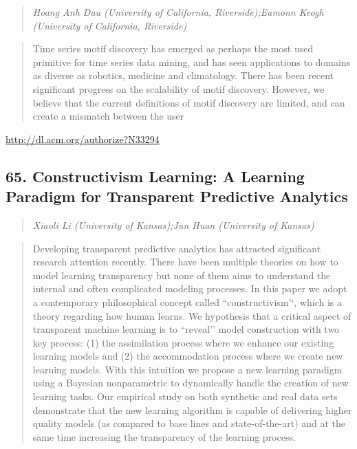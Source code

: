 \documentclass{article}
\begin{document}
\begin{quote}
\footnotesize{\textit{Hoang Anh Dau (University of California, Riverside);Eamonn Keogh (University of California, Riverside)}}

\end{quote}

\begin{quote}
Time series motif discovery has emerged as perhaps the most used primitive for time series data mining, and has seen applications to domains as diverse as robotics, medicine and climatology. There has been recent significant progress on the scalability of motif discovery. However, we believe that the current definitions of motif discovery are limited, and can create a mismatch between the user
\end{quote}

\href{http://dl.acm.org/authorize?N33294}{http://dl.acm.org/authorize?N33294}

\subsection{65. Constructivism Learning: A Learning Paradigm for Transparent Predictive Analytics}

\begin{quote}
\footnotesize{\textit{Xiaoli Li (University of Kansas);Jun Huan (University of Kansas)}}

\end{quote}

\begin{quote}
Developing transparent predictive analytics has attracted significant research attention recently. There have been multiple theories on how to model learning transparency but none of them aims to understand the internal and often complicated modeling processes. In this paper we adopt a contemporary philosophical concept called ``constructivism’‘, which is a theory regarding how human learns. We hypothesis that a critical aspect of transparent machine learning is to ``reveal’’ model construction with two key process: (1) the assimilation process where we enhance our existing learning models and (2) the accommodation process where we create new learning models. With this intuition we propose a new learning paradigm using a Bayesian nonparametric to dynamically handle the creation of new learning tasks. Our empirical study on both synthetic and real data sets demonstrate that the new learning algorithm is capable of delivering higher quality models (as compared to base lines and state-of-the-art) and at the same time increasing the transparency of the learning process.
\end{quote}
\end{document}
